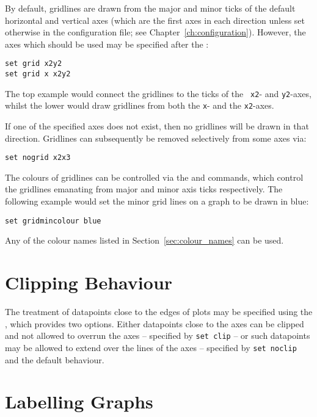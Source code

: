 \noindent By default, gridlines are drawn from the major and minor ticks of the
default horizontal and vertical axes (which are the first axes in each
direction unless set otherwise in the configuration file; see
Chapter~\ref{ch:configuration}).  However, the axes which should be used may be
specified after the :

\begin{verbatim}
set grid x2y2
set grid x x2y2
\end{verbatim}

\noindent The top example would connect the gridlines to the ticks of the {\tt
x2}- and {\tt y2}-axes, whilst the lower would draw gridlines from both the
{\tt x}- and the {\tt x2}-axes.

If one of the specified axes does not exist, then no gridlines will be drawn in
that direction.  Gridlines can subsequently be removed selectively from some
axes via:

\begin{verbatim}
set nogrid x2x3
\end{verbatim}

\label{sec:set_colours}
The colours of gridlines can be
controlled via the  and  commands, which control the gridlines emanating from major and
minor axis ticks respectively. The following example would set the minor grid
lines on a graph to be drawn in blue:

\begin{verbatim}
set gridmincolour blue
\end{verbatim}

\noindent Any of the colour names listed in Section~\ref{sec:colour_names} can
be used.

\section{Clipping Behaviour}

The treatment of datapoints close to the edges of plots may be specified using
the , which provides two options. Either datapoints close to
the axes can be clipped and not allowed to overrun the axes -- specified by
{\tt set clip} -- or such datapoints may be allowed to extend over the lines of
the axes -- specified by {\tt set noclip} and the default behaviour.

\section{Labelling Graphs}

